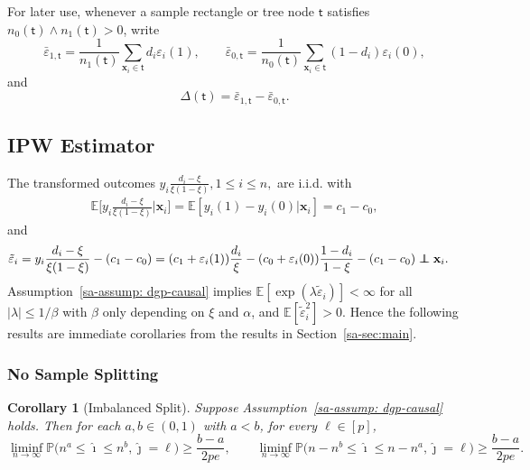 \documentclass[10pt]{article}
\newcommand\independent{\protect\mathpalette{\protect\independenT}{\perp}}
\def\independenT#1#2{\mathrel{\rlap{$#1#2$}\mkern2mu{#1#2}}}
\def\nodet{\mathsf{t}}
\def\bx{\mathbf{x}}
\def\E{\mathbb{E}}
\newtheorem{coro}[theorem]{Corollary}
\theoremstyle{definition}
\theoremstyle{remark}
\begin{document}
For later use, whenever a sample rectangle or tree node $\nodet$ satisfies $n_0(\nodet)\wedge n_1(\nodet)>0$, write
\[
    \bar\varepsilon_{1,\nodet}
    =
    \frac{1}{n_1(\nodet)}
    \sum_{\bx_i\in\nodet}d_i\varepsilon_i(1),
    \qquad
    \bar\varepsilon_{0,\nodet}
    =
    \frac{1}{n_0(\nodet)}
    \sum_{\bx_i\in\nodet}(1-d_i)\varepsilon_i(0),
\]
and
\[
    \Delta(\nodet)=\bar\varepsilon_{1,\nodet}-\bar\varepsilon_{0,\nodet}.
\]

\subsection{IPW Estimator}\label{sa-sec: ipw causal}

The transformed outcomes $y_i \frac{d_i - \xi}{\xi (1 - \xi)}, 1 \leq i \leq n,$ are i.i.d. with 
\begin{align*}
    \E \bigg[y_i \frac{d_i - \xi}{\xi (1 - \xi)}\bigg|\bx_i\bigg] = \E[y_i(1) - y_i(0)|\bx_i] = c_1 - c_0,
\end{align*}
and
\begin{align*}  
    \tilde{\varepsilon}_i = y_i \frac{d_i - \xi}{\xi(1 - \xi)} - (c_1 - c_0)
    & = (c_1 + \varepsilon_i(1)) \frac{d_i}{\xi} - (c_0 + \varepsilon_i(0)) \frac{1 - d_i}{1 - \xi} - (c_1 - c_0) \independent \bx_i.
\end{align*}
Assumption~\ref{sa-assump: dgp-causal} implies $\E[\exp(\lambda \tilde{\varepsilon}_i)] < \infty$ for all $|\lambda| \leq 1 / \beta$ with $\beta$ only depending on $\xi$ and $\alpha$, and $\E[\tilde{\varepsilon}_i^2] >0$. Hence the following results are immediate corollaries from the results in Section~\ref{sa-sec:main}.
 

\subsubsection{No Sample Splitting}




\begin{coro}[Imbalanced Split]\label{coro: inconsistency ipw}
Suppose Assumption~\ref{sa-assump: dgp-causal} holds. Then for each $a,b \in (0,1)$ with $a < b$, for every $\ell \in [p]$,
    \begin{equation*} 
        \liminf_{n\to\infty} \mathbb{P}\big( n^{a} \leq \hat{\imath} \leq n^{b}, \hat{\jmath} = \ell \big) \geq \frac{b-a}{2pe},
        \qquad
        \liminf_{n\to\infty} \mathbb{P}\big( n-n^{b} \leq \hat{\imath} \leq n-n^{a}, \hat{\jmath} = \ell \big) \geq \frac{b-a}{2pe}.
    \end{equation*}
\end{coro}
\end{document}
